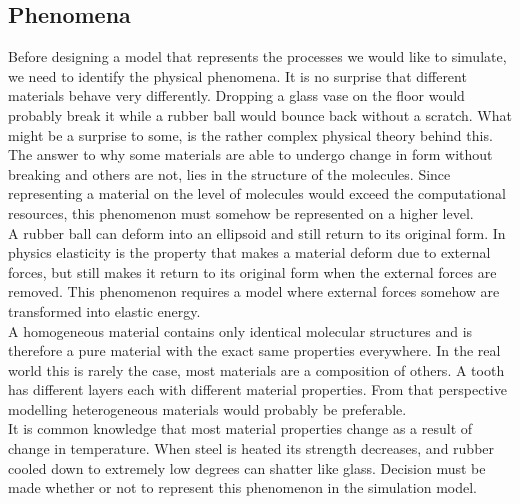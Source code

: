 \subsection{Phenomena}
Before designing a model that represents the processes
we would like to simulate, we need to identify the physical
phenomena. 
It is no surprise that different materials behave very
differently. Dropping a glass vase on the floor would probably break
it while a rubber ball would bounce back without a scratch. What might
be a surprise to some, is the rather complex physical theory behind
this. The answer to why some materials are able to undergo change in form without
breaking and others are not, lies in the structure of the
molecules. Since representing a material on the level of molecules
would exceed the computational resources, this phenomenon must somehow be
represented on a higher level.  \\

A rubber ball can deform into an ellipsoid and still return to its
original form. In physics elasticity is the property that
makes a material deform due to external forces, but still makes it
return to its original form when the external forces are removed. This
phenomenon requires a model where external forces somehow are transformed into
elastic energy. \\



A homogeneous material contains only identical molecular structures
and is therefore a pure material with the exact same properties
everywhere. In the real world this is rarely the case, most materials are a
composition of others. A tooth has different layers each
with different material properties. From that perspective modelling
heterogeneous materials would probably be preferable. \\

It is common knowledge that most material properties change as a
result of change in temperature. When steel is heated its strength
decreases, and rubber cooled down to extremely low degrees can shatter
like glass. Decision must be made whether or not to represent this
phenomenon in the simulation model. \\  

